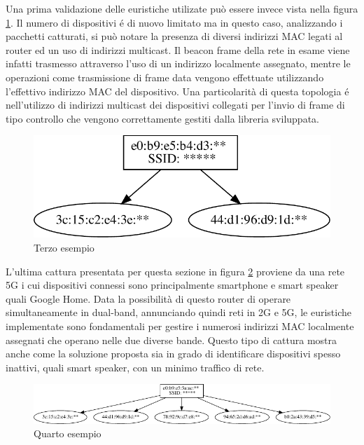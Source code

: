 Una prima validazione delle euristiche utilizate pu\`o essere invece vista nella figura \ref{fig:es3}.
Il numero di dispositivi \'e di nuovo limitato ma in questo caso, analizzando i pacchetti catturati, si pu\`o notare la presenza di diversi indirizzi MAC legati al router ed un uso di indirizzi multicast.
Il beacon frame della rete in esame viene infatti trasmesso attraverso l'uso di un indirizzo localmente assegnato, mentre le operazioni come trasmissione di frame data vengono effettuate utilizzando l'effettivo indirizzo MAC del dispositivo.
Una particolarit\`a di questa topologia \'e nell'utilizzo di indirizzi multicast dei dispositivi collegati per l'invio di frame di tipo controllo che vengono correttamente gestiti dalla libreria sviluppata.


\begin{figure}[!h]
	\centering
	\includegraphics{images/img10censored.pdf}
	\caption{Terzo esempio}
	\label{fig:es3}
\end{figure}


L'ultima cattura presentata per questa sezione in figura \ref{fig:es4} proviene da una rete 5G i cui dispositivi connessi sono principalmente smartphone e smart speaker quali Google Home.
Data la possibilit\`a di questo router di operare simultaneamente in dual-band, annunciando quindi reti in 2G e 5G, le euristiche implementate sono fondamentali per gestire i numerosi indirizzi MAC localmente assegnati che operano nelle due diverse bande.
Questo tipo di cattura mostra anche come la soluzione proposta sia in grado di identificare dispositivi spesso inattivi, quali smart speaker, con un minimo traffico di rete. 


\begin{figure}[!h]
	\centering
	\includegraphics{images/img11censored.pdf}
	\caption{Quarto esempio}
	\label{fig:es4}
\end{figure}

